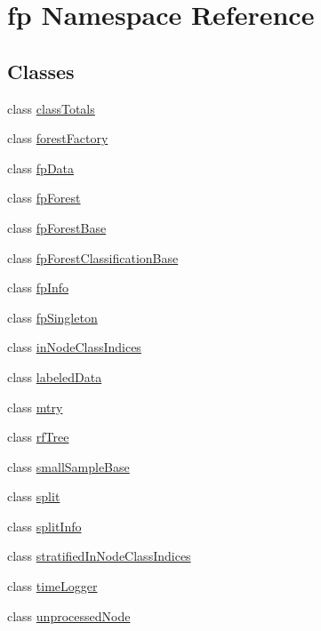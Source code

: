 \hypertarget{namespacefp}{}\section{fp Namespace Reference}
\label{namespacefp}
\subsection*{Classes}
\begin{DoxyCompactItemize}
\item 
class \hyperlink{classfp_1_1classTotals}{class\+Totals}
\item 
class \hyperlink{classfp_1_1forestFactory}{forest\+Factory}
\item 
class \hyperlink{classfp_1_1fpData}{fp\+Data}
\item 
class \hyperlink{classfp_1_1fpForest}{fp\+Forest}
\item 
class \hyperlink{classfp_1_1fpForestBase}{fp\+Forest\+Base}
\item 
class \hyperlink{classfp_1_1fpForestClassificationBase}{fp\+Forest\+Classification\+Base}
\item 
class \hyperlink{classfp_1_1fpInfo}{fp\+Info}
\item 
class \hyperlink{classfp_1_1fpSingleton}{fp\+Singleton}
\item 
class \hyperlink{classfp_1_1inNodeClassIndices}{in\+Node\+Class\+Indices}
\item 
class \hyperlink{classfp_1_1labeledData}{labeled\+Data}
\item 
class \hyperlink{classfp_1_1mtry}{mtry}
\item 
class \hyperlink{classfp_1_1rfTree}{rf\+Tree}
\item 
class \hyperlink{classfp_1_1smallSampleBase}{small\+Sample\+Base}
\item 
class \hyperlink{classfp_1_1split}{split}
\item 
class \hyperlink{classfp_1_1splitInfo}{split\+Info}
\item 
class \hyperlink{classfp_1_1stratifiedInNodeClassIndices}{stratified\+In\+Node\+Class\+Indices}
\item 
class \hyperlink{classfp_1_1timeLogger}{time\+Logger}
\item 
class \hyperlink{classfp_1_1unprocessedNode}{unprocessed\+Node}
\end{DoxyCompactItemize}
